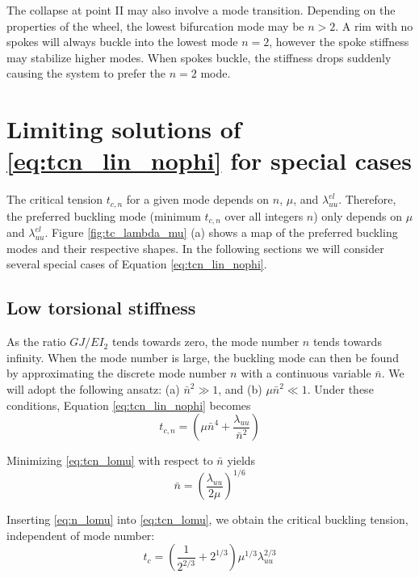 \documentclass[\rootdir/thesis.tex]{subfiles}
\begin{document}
The collapse at point II may also involve a mode transition. Depending on the properties of the wheel, the lowest bifurcation mode may be $n>2$. A rim with no spokes will always buckle into the lowest mode $n=2$, however the spoke stiffness may stabilize higher modes. When spokes buckle, the stiffness drops suddenly causing the system to prefer the $n=2$ mode.


\section{Limiting solutions of \eqref{eq:tcn_lin_nophi} for special cases}

The critical tension $t_{c,n}$ for a given mode depends on $n$, $\mu$, and $\lambda_{uu}^{el}$. Therefore, the preferred buckling mode (minimum $t_{c,n}$ over all integers $n$) only depends on $\mu$ and $\lambda_{uu}^{el}$. Figure \ref{fig:tc_lambda_mu} (a) shows a map of the preferred buckling modes and their respective shapes. In the following sections we will consider several special cases of Equation \eqref{eq:tcn_lin_nophi}.

\subsection{Low torsional stiffness}
As the ratio $GJ/EI_2$ tends towards zero, the mode number $n$ tends towards infinity. When the mode number is large, the buckling mode can then be found by approximating the discrete mode number $n$ with a continuous variable $\bar{n}$. We will adopt the following ansatz: (a) $\bar{n}^2 \gg 1$, and (b) $\mu\bar{n}^2 \ll 1$. Under these conditions, Equation \eqref{eq:tcn_lin_nophi} becomes
\begin{equation}
\label{eq:tcn_lomu}
t_{c,n} = \left(\mu \bar{n}^4 + \frac{\lambda_{uu}}{\bar{n}^2}\right)
\end{equation}

Minimizing \eqref{eq:tcn_lomu} with respect to $\bar{n}$ yields
\begin{equation}
\label{eq:n_lomu}
\bar{n}=\left(\frac{\lambda_{uu}}{2\mu}\right)^{1/6}
\end{equation}

Inserting \eqref{eq:n_lomu} into \eqref{eq:tcn_lomu}, we obtain the critical buckling tension, independent of mode number:
\begin{equation}
\label{eq:tc_lomu}
t_c = \left(\frac{1}{2^{2/3}} + 2^{1/3}\right)\mu^{1/3}\lambda_{uu}^{2/3}
\end{equation}
\end{document}
